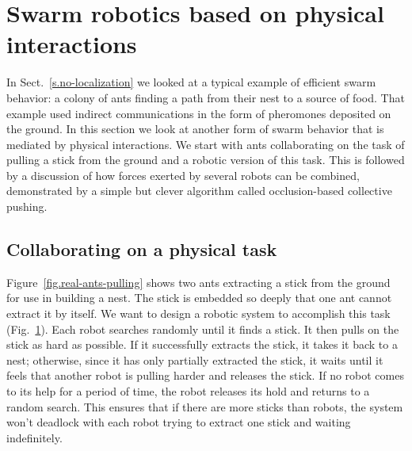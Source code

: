 \section{Swarm robotics based on physical interactions}\label{s.swarm-physical}

In Sect.~\ref{s.no-localization} we looked at a typical example of efficient swarm behavior: a colony of ants finding a path from their nest to a source of food. That example used indirect communications in the form of pheromones deposited on the ground. In this section we look at another form of swarm behavior that is mediated by physical interactions. We start with ants collaborating on the task of pulling a stick from the ground and a robotic version of this task. This is followed by a discussion of how forces exerted by several robots can be combined, demonstrated by a simple but clever algorithm called occlusion-based collective pushing.

\subsection{Collaborating on a physical task}

Figure~\ref{fig.real-ants-pulling} shows two ants extracting a stick from the ground for use in building a nest. The stick is embedded so deeply that one ant cannot extract it by itself. We want to design a robotic system to accomplish this task (Fig.~\ref{fig.robots-pulling}). Each robot searches randomly until it finds a stick. It then pulls on the stick as hard as possible. If it successfully extracts the stick, it takes it back to a nest; otherwise, since it has only partially extracted the stick, it waits until it feels that another robot is pulling harder and releases the stick. If no robot comes to its help for a period of time, the robot releases its hold and returns to a random search. This ensures that if there are more sticks than robots, the system won't deadlock with each robot trying to extract one stick and waiting indefinitely.

\begin{figure}
\subfigures
\begin{minipage}{\textwidth}
\hspace{\fill}
\label{fig.real-ants-pulling}
\label{fig.robots-pulling}
\end{minipage}
\end{figure}

